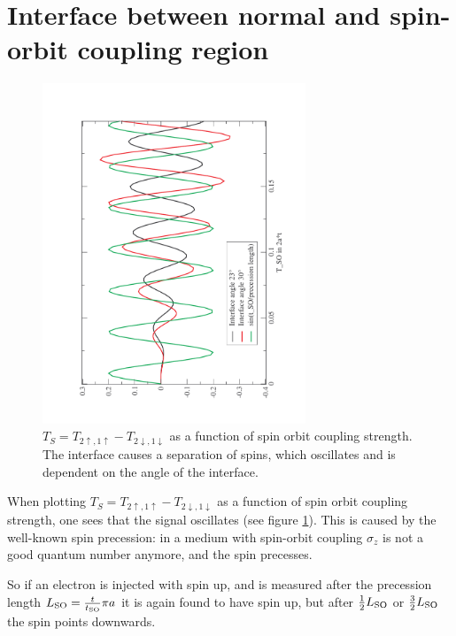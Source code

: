 \section{Interface between normal and spin-orbit coupling region}

\begin{figure}
    \begin{center}
    \includegraphics[angle=270,width=0.7\textwidth]{interface-precession.pdf}
    \end{center}
    \caption{$T_S = T_{2\uparrow,1\uparrow}-T_{2\downarrow,1\downarrow}$ as a
        function of spin orbit coupling strength. The interface causes a
        separation of spins, which oscillates and is dependent on the angle of
        the interface.}
    \label{fig:interface-precession}
\end{figure}

When plotting $T_S = T_{2\uparrow,1\uparrow}-T_{2\downarrow,1\downarrow}$ as a
function of spin orbit coupling strength, one sees that the signal oscillates
(see figure \ref{fig:interface-precession}).
This is caused by the well-known %
spin precession: in a medium with spin-orbit coupling $\sigma_z$ is not a good
quantum number anymore, and the spin precesses. %

So if an electron is injected with spin up, and is measured after the
precession length $L_{\textnormal{SO}} = \frac{t}{t_{\textnormal{SO}}}\pi a$ it is again found to have
spin up, but after $\frac12 L_{\textnormal{SO}}$ or $\frac32 L_{\textnormal{SO}}$ the spin points
downwards. 

